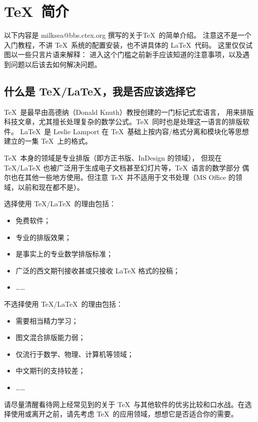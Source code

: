 \clearpage

\section{\TeX\ 简介}

以下内容是 milksea@bbs.ctex.org 撰写的关于\TeX\ 的简单介绍。
注意这不是一个入门教程，不讲 \TeX\ 系统的配置安装，也不讲具体的 \LaTeX\ 代码。
这里仅仅试图以一些只言片语来解释：
进入这个门槛之前新手应该知道的注意事项，以及遇到问题以后该去如何解决问题。

\subsection{什么是 \TeX/\LaTeX，我是否应该选择它}

\TeX\ 是最早由高德纳（Donald Knuth）教授创建的一门标记式宏语言，
用来排版科技文章，尤其擅长处理复杂的数学公式。\TeX\ 同时也是处理这一语言的排版软件。
\LaTeX\ 是 Leslie Lamport 在 \TeX\ 基础上按内容/格式分离和模块化等思想建立的一集 \TeX\ 上的格式。

\TeX\ 本身的领域是专业排版（即方正书版、InDesign 的领域），
但现在 TeX/LaTeX 也被广泛用于生成电子文档甚至幻灯片等，\TeX\ 语言的数学部分
偶尔也在其他一些地方使用。但注意 \TeX\ 并不适用于文书处理（MS Office 的领域，以前和现在都不是）。

选择使用 \TeX/\LaTeX\ 的理由包括：
\begin{itemize}
\item 免费软件；
\item 专业的排版效果；
\item 是事实上的专业数学排版标准；
\item 广泛的西文期刊接收甚或只接收 LaTeX 格式的投稿；
\item[] ……
\end{itemize}
不选择使用 \TeX/\LaTeX\ 的理由包括：
\begin{itemize}
\item 需要相当精力学习；
\item 图文混合排版能力弱；
\item 仅流行于数学、物理、计算机等领域；
\item 中文期刊的支持较差；
\item[] ……
\end{itemize}

请尽量清醒看待网上经常见到的关于 \TeX\ 与其他软件的优劣比较和口水战。在选择使用或离开之前，请先考虑
\TeX\ 的应用领域，想想它是否适合你的需要。

\def\AAAA{}

